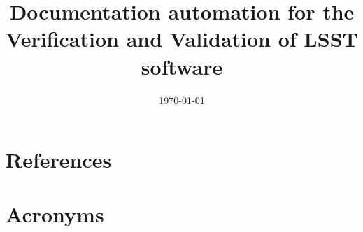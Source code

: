 \documentclass[]{spie}
\begin{document}

\date{\today}
\title{Documentation automation for the Verification and Validation of LSST software}





\appendix

\section{References} \label{sec:bib}
%



\section{Acronyms} \label{sec:acronyms}

\end{document}
